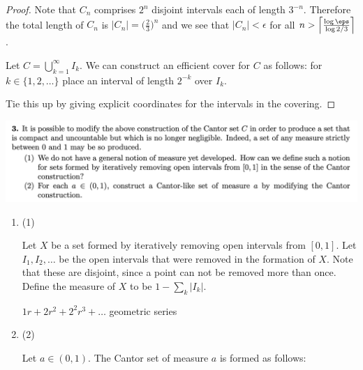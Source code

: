 \begin{itemize}
\begin{proof}
    Note that $C_n$ comprises $2^n$ disjoint intervals each of length $3^{-n}$. Therefore the total length
    of $C_n$ is $|C_n| = \big(\frac{2}{3}\big)^n$ and we see that $|C_n| < \epsilon$ for all $n > \Big\lceil\frac{\log\eps}{\log 2/3} \Big\rceil$.

    Let $C = \bigcup_{k=1}^\infty I_k$. We can construct an efficient cover for $C$ as follows:
    for $k \in \{1, 2, \ldots\}$ place an interval of length $2^{-k}$ over $I_k$.

     Tie this up by giving explicit coordinates for the intervals in the covering.
  \end{proof}

\end{itemize}


\begin{mdframed}
  \includegraphics[width=400pt]{img/analysis--berkeley-202a-6b7a.png}
\end{mdframed}

\begin{enumerate}[label=(3.\arabic*)]

\item (1)
  \begin{definition*}
    Let $X$ be a set formed by iteratively removing open intervals from $[0, 1]$. Let $I_1, I_2, \ldots$ be the
    open intervals that were removed in the formation of $X$. Note that these are disjoint, since a point can
    not be removed more than once. Define the measure of $X$ to be $1 - \sum_k |I_k|$.

    $1r + 2r^2 + 2^2r^3 + \ldots$ geometric series
  \end{definition*}

\item (2)
  \begin{definition}
    Let $a \in (0, 1)$. The Cantor set of measure $a$ is formed as follows:

  \end{definition}

\end{enumerate}




